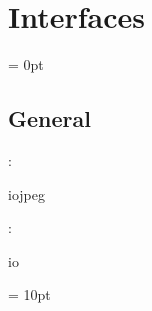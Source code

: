
\section{Interfaces} 


\parskip = 0pt

\vspace{3mm} \subsection*{General}

: 

iojpeg
\vspace{2mm}

: 

io
\vspace{2mm}

\vspace{5mm}\parskip = 10pt 
